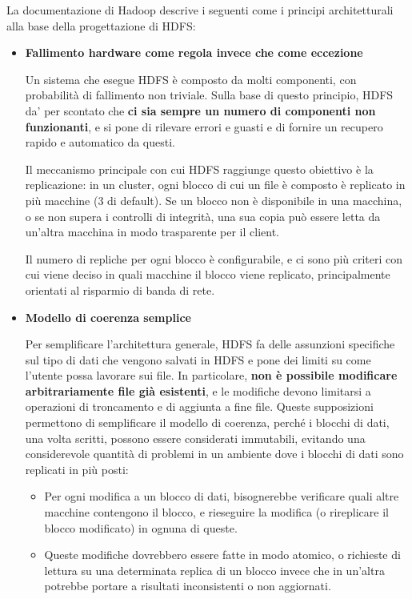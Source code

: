 \documentclass[italian,a4paper, twoside, 12pt]{report}
\begin{document}
La documentazione di Hadoop descrive i seguenti come i principi
architetturali alla base della progettazione di HDFS:

\begin{itemize}
\item
  \textbf{Fallimento hardware come regola invece che come eccezione}

  Un sistema che esegue HDFS è composto da molti componenti, con
  probabilità di fallimento non triviale. Sulla base di questo
  principio, HDFS da' per scontato che \textbf{ci sia sempre un numero
  di componenti non funzionanti}, e si pone di rilevare errori e guasti
  e di fornire un recupero rapido e automatico da questi.

  Il meccanismo principale con cui HDFS raggiunge questo obiettivo è la
  replicazione: in un cluster, ogni blocco di cui un file è composto è
  replicato in più macchine (3 di default). Se un blocco non è
  disponibile in una macchina, o se non supera i controlli di integrità,
  una sua copia può essere letta da un'altra macchina in modo
  trasparente per il client.

  Il numero di repliche per ogni blocco è configurabile, e ci sono più
  criteri con cui viene deciso in quali macchine il blocco viene
  replicato, principalmente orientati al risparmio di banda di rete.
\item
  \textbf{Modello di coerenza semplice}

  Per semplificare l'architettura generale, HDFS fa delle assunzioni
  specifiche sul tipo di dati che vengono salvati in HDFS e pone dei
  limiti su come l'utente possa lavorare sui file. In particolare,
  \textbf{non è possibile modificare arbitrariamente file già
  esistenti}, e le modifiche devono limitarsi a operazioni di
  troncamento e di aggiunta a fine file. Queste supposizioni permettono
  di semplificare il modello di coerenza, perché i blocchi di dati, una
  volta scritti, possono essere considerati immutabili, evitando una
  considerevole quantità di problemi in un ambiente dove i blocchi di
  dati sono replicati in più posti:

  \begin{itemize}
  \item
    Per ogni modifica a un blocco di dati, bisognerebbe verificare quali
    altre macchine contengono il blocco, e rieseguire la modifica (o
    rireplicare il blocco modificato) in ognuna di queste.
  \item
    Queste modifiche dovrebbero essere fatte in modo atomico, o
    richieste di lettura su una determinata replica di un blocco invece
    che in un'altra potrebbe portare a risultati inconsistenti o non
    aggiornati.
  \end{itemize}


\end{itemize}
\end{document}
